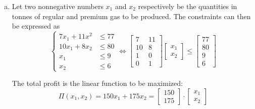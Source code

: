 \documentclass[a4paper,12pt]{article}
\begin{document}
\begin{enumerate}[(a)]
  \item Let two nonnegative numbers $x_1$ and $x_2$ respectively be
    the quantities in tonnes of regular and premium gas to be produced.
    The constraints can then be expressed as
    \[\begin{cases}
      7x_1 + 11x^2 &\le 77\\
      10x_1 + 8x_2 &\le 80\\
      x_1 &\le 9\\
      x_2 &\le 6
    \end{cases}
    \iff \begin{bmatrix}
      7 & 11\\
      10 & 8\\
      1 & 0\\
      0 & 1
    \end{bmatrix}\begin{bmatrix}
      x_1\\ x_2
    \end{bmatrix}
    \le \begin{bmatrix}
      77\\ 80\\ 9\\ 6
    \end{bmatrix}\]

    The total profit is the linear function to be maximized:
    \[\Pi(x_1, x_2) = 150x_1 + 175x_2 = \begin{bmatrix}
      150\\ 175
    \end{bmatrix}\cdot\begin{bmatrix}
      x_1\\ x_2
    \end{bmatrix}\]


\end{enumerate}
\end{document}
